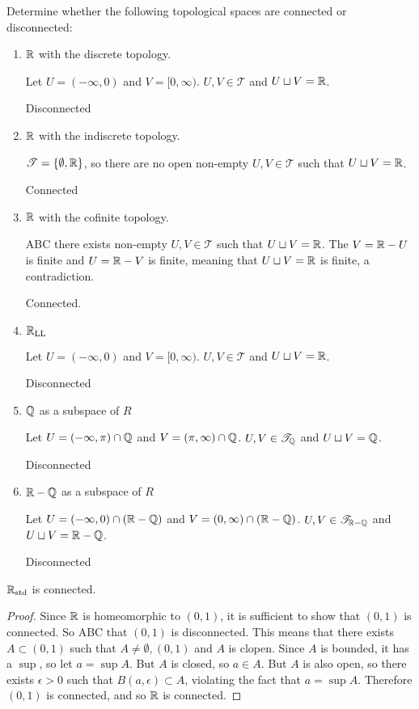 \documentclass[letterpaper,12pt,fleqn]{article}
\newcommand{\T}{\mathscr{T}}
\newcommand{\e}{\epsilon}
\begin{document}
\begin{example}
  Determine whether the following topological spaces are connected or disconnected:
  \begin{enumerate}
  \item \(\mathbb{R}\) with the discrete topology.

    Let \(U=(-\infty,0)\) and \(V=[0,\infty)\).  \(U,V\in\T\) and \(U\sqcup V=\mathbb{R}\).

    Disconnected

  \item \(\mathbb{R}\) with the indiscrete topology.

    \(\T=\set{\emptyset,\R}\), so there are no open non-empty \(U,V\in\T\) such that \(U\sqcup V=\mathbb{R}\).

    Connected

  \item \(\mathbb{R}\) with the cofinite topology.

    ABC there exists non-empty \(U,V\in\T\) such that \(U\sqcup V=\mathbb{R}\).  The \(V=\mathbb{R}-U\) is finite and
    \(U=\mathbb{R}-V\) is finite, meaning that \(U\sqcup V=\mathbb{R}\) is finite, a contradiction.

    Connected.

  \item \(\mathbb{R}_{\text{LL}}\)

    Let \(U=(-\infty,0)\) and \(V=[0,\infty)\).  \(U,V\in\T\) and \(U\sqcup V=\mathbb{R}\).

    Disconnected

  \item \(\mathbb{Q}\) as a subspace of \(R\)

    Let \(U=(-\infty,\pi)\cap\mathbb{Q}\) and \(V=(\pi,\infty)\cap\mathbb{Q}\).  \(U,V\in\T_{\Q}\) and \(U\sqcup V=\mathbb{Q}\).

    Disconnected

  \item \(\mathbb{R}-\mathbb{Q}\) as a subspace of \(R\)

    Let \(U=(-\infty,0)\cap(\mathbb{R}-\mathbb{Q})\) and \(V=(0,\infty)\cap(\mathbb{R}-\mathbb{Q})\).  \(U,V\in\T_{\R-\Q}\) and \(U\sqcup V=\mathbb{R}-\mathbb{Q}\).

    Disconnected
  \end{enumerate}
\end{example}

\begin{theorem}
  \(\mathbb{R}_{\text{std}}\) is connected.
\end{theorem}

\begin{proof}
  Since \(\mathbb{R}\) is homeomorphic to \((0,1)\), it is sufficient to show that \((0,1)\) is connected.  So ABC that
  \((0,1)\) is disconnected.  This means that there exists \(A\subset(0,1)\) such that \(A\ne\emptyset,(0,1)\) and
  \(A\) is clopen.  Since \(A\) is bounded, it has a \(\sup\), so let \(a=\sup A\).  But \(A\) is closed, so
  \(a\in A\).  But \(A\) is also open, so there exists \(\e>0\) such that \(B(a,\e)\subset A\), violating the fact
  that \(a=\sup A\).  Therefore \((0,1)\) is connected, and so \(\mathbb{R}\) is connected.
\end{proof}
\end{document}

